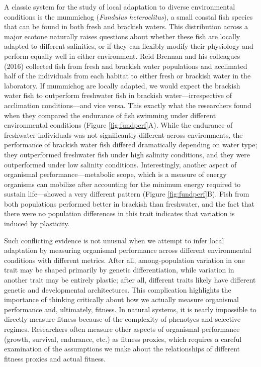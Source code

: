 \documentclass[
]{book}
\begin{document}
A classic system for the study of local adaptation to diverse environmental conditions is the mummichog (\emph{Fundulus heteroclitus}), a small coastal fish species that can be found in both fresh and brackish waters. This distribution across a major ecotone naturally raises questions about whether these fish are locally adapted to different salinities, or if they can flexibly modify their physiology and perform equally well in either environment. Reid Brennan and his colleagues (2016) collected fish from fresh and brackish water populations and acclimated half of the individuals from each habitat to either fresh or brackish water in the laboratory. If mummichog are locally adapted, we would expect the brackish water fish to outperform freshwater fish in brackish water---irrespective of acclimation conditions---and vice versa. This exactly what the researchers found when they compared the endurance of fish swimming under different environmental conditions (Figure \ref{fig:fundperf}A). While the endurance of freshwater individuals was not significantly different across environments, the performance of brackish water fish differed dramatically depending on water type; they outperformed freshwater fish under high salinity conditions, and they were outperformed under low salinity conditions. Interestingly, another aspect of organismal performance---metabolic scope, which is a measure of energy organisms can mobilize after accounting for the minimum energy required to sustain life---showed a very different pattern (Figure \ref{fig:fundperf}B). Fish from both populations performed better in brackish than freshwater, and the fact that there were no population differences in this trait indicates that variation is induced by plasticity.

Such conflicting evidence is not unusual when we attempt to infer local adaptation by measuring organismal performance across different environmental conditions with different metrics. After all, among-population variation in one trait may be shaped primarily by genetic differentiation, while variation in another trait may be entirely plastic; after all, different traits likely have different genetic and developmental architectures. This complication highlights the importance of thinking critically about how we actually measure organismal performance and, ultimately, fitness. In natural systems, it is nearly impossible to directly measure fitness because of the complexity of phenotyes and selective regimes. Researchers often measure other aspects of organismal performance (growth, survival, endurance, etc.) as fitness proxies, which requires a careful examination of the assumptions we make about the relationships of different fitness proxies and actual fitness.
\end{document}
